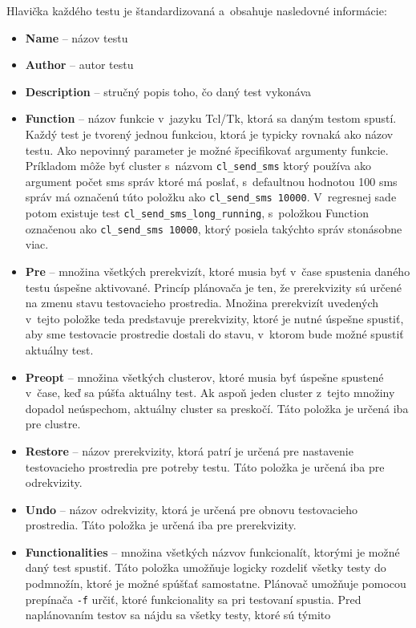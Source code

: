 Hlavička každého testu je štandardizovaná a~obsahuje nasledovné informácie:
\begin{itemize}
\item \textbf{Name} -- názov testu
\item \textbf{Author} -- autor testu
\item \textbf{Description} -- stručný popis toho, čo daný test vykonáva
\item \textbf{Function} -- názov funkcie v~jazyku Tcl/Tk, ktorá sa daným 
testom spustí. Každý test je tvorený jednou funkciou, ktorá je typicky 
rovnaká ako názov testu. Ako nepovinný parameter je možné špecifikovať 
argumenty funkcie. Príkladom môže byť cluster s~názvom 
\texttt{cl\_send\_sms} ktorý používa ako argument počet sms správ ktoré 
má poslať, s~defaultnou hodnotou 100 sms správ 
má označenú túto položku ako \texttt{cl\_send\_sms 10000}. 
V~regresnej sade potom existuje test \texttt{cl\_send\_sms\_long\_running}, 
s~položkou Function označenou ako \texttt{cl\_send\_sms 10000}, ktorý 
posiela takýchto správ stonásobne viac.
\item \textbf{Pre} -- množina všetkých prerekvizít, ktoré musia byť 
v~čase spustenia daného testu úspešne aktivované. 
Princíp plánovača je ten, že prerekvizity sú určené na zmenu stavu 
testovacieho prostredia. Množina prerekvizít uvedených v~tejto položke 
teda predstavuje prerekvizity, ktoré je nutné úspešne spustiť, aby sme 
testovacie prostredie dostali do stavu, v~ktorom bude možné spustiť 
aktuálny test.
\item \textbf{Preopt} -- množina všetkých clusterov, ktoré musia byť 
úspešne spustené v~čase, keď sa púšťa aktuálny test. 
Ak aspoň jeden cluster z~tejto množiny dopadol neúspechom, aktuálny 
cluster sa preskočí. Táto položka je určená iba pre clustre.
\item \textbf{Restore} -- názov prerekvizity, ktorá patrí je určená pre 
nastavenie testovacieho prostredia pre potreby testu. 
Táto položka je určená iba pre odrekvizity.
\item \textbf{Undo} -- názov odrekvizity, ktorá je určená pre obnovu 
testovacieho prostredia. Táto položka je určená iba pre prerekvizity. 
\item \textbf{Functionalities} -- množina všetkých názvov funkcionalít, 
ktorými je možné daný test spustiť. 
Táto položka umožňuje logicky rozdeliť všetky testy do podmnožín, 
ktoré je možné spúšťať samostatne. 
Plánovač umožňuje pomocou prepínača \texttt{-f} určiť, ktoré 
funkcionality sa pri testovaní spustia.
Pred naplánovaním testov sa nájdu sa všetky testy, ktoré sú týmito 

\end{itemize}
